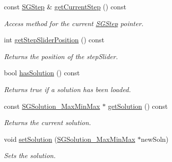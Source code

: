 \begin{DoxyCompactItemize}
\mbox{\label{classSGPlotController__V2_a837430ca072623f8a84aa94e423a9b91}} 
const \hyperlink{classSGStep}{S\+G\+Step} \& \hyperlink{classSGPlotController__V2_a837430ca072623f8a84aa94e423a9b91}{get\+Current\+Step} () const
\begin{DoxyCompactList}\small\item\em Access method for the current \hyperlink{classSGStep}{S\+G\+Step} pointer. \end{DoxyCompactList}\item 
\mbox{\label{classSGPlotController__V2_a4b73ba1d9144fc5bb20d49e363627f6c}} 
int \hyperlink{classSGPlotController__V2_a4b73ba1d9144fc5bb20d49e363627f6c}{get\+Step\+Slider\+Position} () const
\begin{DoxyCompactList}\small\item\em Returns the position of the step\+Slider. \end{DoxyCompactList}\item 
\mbox{\label{classSGPlotController__V2_a9f046cf5437b0142155e202d5af1020b}} 
bool \hyperlink{classSGPlotController__V2_a9f046cf5437b0142155e202d5af1020b}{has\+Solution} () const
\begin{DoxyCompactList}\small\item\em Returns true if a solution has been loaded. \end{DoxyCompactList}\item 
\mbox{\label{classSGPlotController__V2_accb826c6ffd843e6d4b49fe84c35bbe3}} 
const \hyperlink{classSGSolution__MaxMinMax}{S\+G\+Solution\+\_\+\+Max\+Min\+Max} $\ast$ \hyperlink{classSGPlotController__V2_accb826c6ffd843e6d4b49fe84c35bbe3}{get\+Solution} () const
\begin{DoxyCompactList}\small\item\em Returns the current solution. \end{DoxyCompactList}\item 
\mbox{\label{classSGPlotController__V2_acb1155a28169b0e85f15ecc3f7907313}} 
void \hyperlink{classSGPlotController__V2_acb1155a28169b0e85f15ecc3f7907313}{set\+Solution} (\hyperlink{classSGSolution__MaxMinMax}{S\+G\+Solution\+\_\+\+Max\+Min\+Max} $\ast$new\+Soln)
\begin{DoxyCompactList}\small\item\em Sets the solution. \end{DoxyCompactList}\item 

\end{DoxyCompactItemize}
